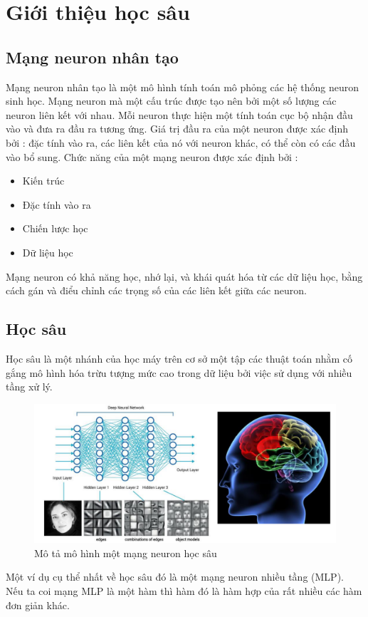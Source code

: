 \documentclass[a4paper,12pt]{report}
\begin{document}
\chapter{Giới thiệu học sâu}
\section{Mạng neuron nhân tạo}
Mạng neuron nhân tạo là một mô hình tính toán mô phỏng các hệ thống neuron sinh học. Mạng neuron mà một cấu trúc được tạo nên bởi một số lượng các neuron liên kết với nhau. Mỗi neuron thực hiện một tính toán cục bộ nhận đầu vào và đưa ra đầu ra tương ứng. Giá trị đầu ra của một neuron được xác định bởi : đặc tính vào ra, các liên kết của nó với neuron khác, có thể còn có các đầu vào bổ sung. Chức năng của một  mạng neuron được xác định bởi :
\begin{itemize}
\item Kiến trúc
\item Đặc tính vào ra
\item Chiến lược học
\item Dữ liệu học 
\end{itemize}
Mạng neuron có khả năng học, nhớ lại, và khái quát hóa từ các dữ liệu học, bằng cách gán và điểu chỉnh các trọng số của các liên kết giữa các neuron.
\section{Học sâu}
Học sâu là một nhánh của học máy trên cơ sở một tập các thuật toán nhằm cố gắng mô hình hóa trừu tượng mức cao trong dữ liệu bởi việc sử dụng với nhiều tầng xử lý. 

\begin{figure}[H]
\includegraphics[scale=0.45]{deeplearning.png}
\caption{Mô tả mô hình một mạng neuron học sâu}
\end{figure}
Một ví dụ cụ thể nhất về học sâu đó là một mạng neuron nhiều tầng (MLP). Nếu ta coi mạng MLP là một hàm thì hàm đó là hàm hợp của rất nhiều các hàm đơn giản khác.
\end{document}
